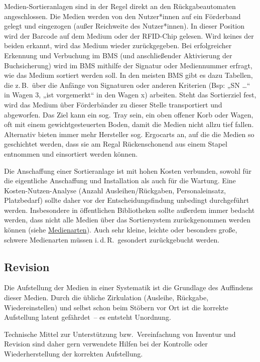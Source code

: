 \documentclass[
  11pt,
  letterpaper,
  DIV=11,
  twoside]{scrreprt}
\begin{document}
Medien-Sortieranlagen sind in der Regel direkt an den Rückgabeautomaten
angeschlossen. Die Medien werden von den Nutzer*innen auf ein Förderband
gelegt und eingezogen (außer Reichweite des Nutzer*innen). In dieser
Position wird der Barcode auf dem Medium oder der RFID-Chip gelesen.
Wird keines der beiden erkannt, wird das Medium wieder zurückgegeben.
Bei erfolgreicher Erkennung und Verbuchung im BMS (und anschließender
Aktivierung der Buchsicherung) wird im BMS mithilfe der Signatur oder
Mediennummer erfragt, wie das Medium sortiert werden soll. In den
meisten BMS gibt es dazu Tabellen, die z.\,B.~über die Anfänge von
Signaturen oder anderen Kriterien (Bsp: „SN \ldots{}`` in Wagen 3, „ist
vorgemerkt`` in den Wagen x) arbeiten. Steht das Sortierziel fest, wird
das Medium über Förderbänder zu dieser Stelle transportiert und
abgeworfen. Das Ziel kann ein sog. Tray sein, ein oben offener Korb oder
Wagen, oft mit einem gewichtgesteuerten Boden, damit die Medien nicht
allzu tief fallen. Alternativ bieten immer mehr Hersteller sog.
Ergocarts an, auf die die Medien so geschichtet werden, dass sie am
Regal Rückenschonend aus einem Stapel entnommen und einsortiert werden
können.

Die Anschaffung einer Sortieranlage ist mit hohen Kosten verbunden,
sowohl für die eigentliche Anschaffung und Installation als auch für die
Wartung. Eine Kosten-Nutzen-Analyse (Anzahl Ausleihen/Rückgaben,
Personaleinsatz, Platzbedarf) sollte daher vor der Entscheidungsfindung
unbedingt durchgeführt werden. Insbesondere in öffentlichen Bibliotheken
sollte außerdem immer bedacht werden, dass nicht alle Medien über das
Sortiersystem zurückgenommen werden können (siehe
\hyperref[medienarten]{Medienarten}). Auch sehr kleine, leichte oder
besonders große, schwere Medienarten müssen i.\,d.\,R.~gesondert
zurückgebucht werden.

\subsection{Revision}\label{revision}

Die Aufstellung der Medien in einer Systematik ist die Grundlage des
Auffindens dieser Medien. Durch die übliche Zirkulation (Ausleihe,
Rückgabe, Wiedereinstellen) und selbst schon beim Stöbern vor Ort ist
die korrekte Aufstellung latent gefährdet~-- es entsteht Unordnung.

Technische Mittel zur Unterstützung bzw.~Vereinfachung von Inventur und
Revision sind daher gern verwendete Hilfen bei der Kontrolle oder
Wiederherstellung der korrekten Aufstellung.
\end{document}
